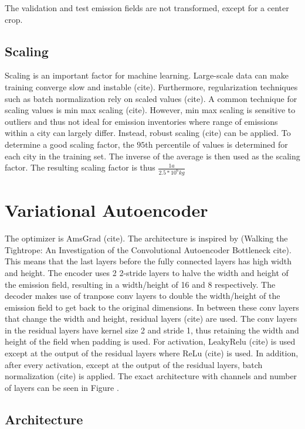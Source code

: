 The validation and test emission fields are not transformed, except for a center crop.

\subsection{Scaling}
Scaling is an important factor for machine learning.
Large-scale data can make training converge slow and instable (cite).
Furthermore, regularization techniques such as batch normalization rely on scaled values (cite).
A common technique for scaling values is min max scaling (cite).
However, min max scaling is sensitive to outliers and thus not ideal for emission inventories where range of emissions within a city can largely differ.
Instead, robust scaling (cite) can be applied.
To determine a good scaling factor, the $95$th percentile of values is determined for each city in the training set.
The inverse of the average is then used as the scaling factor.
The resulting scaling factor is thus $\frac{1 a}{2.5 * 10^6 kg}$

\section{Variational Autoencoder}
The optimizer is AmsGrad (cite).
The architecture is inspired by (Walking the Tightrope: An Investigation of the Convolutional Autoencoder Bottleneck cite).
This means that the last layers before the fully connected layers has high width and height.
The encoder uses 2 2-stride layers to halve the width and height of the emission field, resulting in a width/height of 16 and 8 respectively.
The decoder makes use of tranpose conv layers to double the width/height of the emission field to get back to the original dimensions.
In between these conv layers that change the width and height, residual layers (cite) are used.
The conv layers in the residual layers have kernel size 2 and stride 1, thus retaining the width and height of the field when padding is used.
For activation, LeakyRelu (cite) is used except at the output of the residual layers where ReLu (cite) is used.
In addition, after every activation, except at the output of the residual layers, batch normalization (cite) is applied.
The exact architecture with channels and number of layers can be seen in Figure .

\subsection{Architecture}

